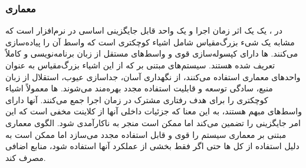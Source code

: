 \subsubsection{معماری }
\label{archCompBasedSec}
\begin{RTL}
در ،
یک  یک اثر زمان اجرا و یک واحد قابل
جایگزینی اساسی در نرم‌افزار است
که مشابه یک شیء بزرگ‌مقیاس شامل اشیاء کوچکتری است که واسط آن را
پیاده‌سازی می‌کنند. ها دارای کپسوله‌سازی قوی و
واسط‌های مستقل از زبان برنامه‌نویسی و کاملاً تعریف شده هستند.
سیستم‌های مبتنی بر 
که از این اشیاء بزرگ‌مقیاس به عنوان واحدهای معماری استفاده می‌کنند، از نگهداری
آسان، جداسازی عیوب، استقلال از زبان منبع، سادگی توسعه و قابلیت استفاده مجدد
بهره‌مند می‌شوند. ها معمولاً اشیاء کوچکتری را
برای هدف رفتاری مشترک در زمان اجرا جمع می‌کنند.
آنها دارای واسط‌های مبهم هستند، به این معنا که جزئیات
داخلی آنها از کلاینت مخفی است که این امر جایگزینی را تضمین می‌کند
اما ممکن است منجر به ناکارآمدی شود.
الگوی معماری مبتنی بر  \cite{ref4} معماری
سیستم را قوی و قابل استفاده مجدد می‌سازد اما ممکن است به دلیل
استفاده از کل ها حتی اگر فقط بخشی از عملکرد آنها
استفاده شود، منابع اضافی مصرف کند.
\end{RTL}